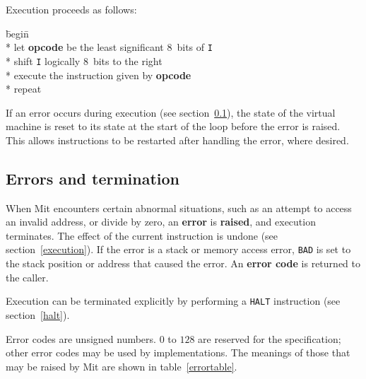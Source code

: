 \documentclass[a4paper]{article}
\newcommand{\instsize}{$8$}
\begin{document}
Execution proceeds as follows:

\begin{tabbing}
\hspace{0.5in}\=begin\=\+\+ \\*
let \textbf{opcode} be the least significant \instsize\ bits of {\tt I} \\*
shift {\tt I} logically \instsize\ bits to the right \\*
execute the instruction given by \textbf{opcode} \- \\*
repeat
\end{tabbing}

If an error occurs during execution (see section~\ref{errors}), the state of the virtual machine is reset to its state at the start of the loop before the error is raised. This allows instructions to be restarted after handling the error, where desired.

\subsection{Errors and termination}
\label{errors}

When Mit encounters certain abnormal situations, such as an attempt to access an invalid address, or divide by zero, an {\bf error} is {\bf raised}, and execution terminates. The effect of the current instruction is undone (see section~\ref{execution}). If the error is a stack or memory access error, {\tt BAD} is set to the stack position or address that caused the error. An {\bf error code} is returned to the caller.

Execution can be terminated explicitly by performing a {\tt HALT} instruction (see section~\ref{halt}).

Error codes are unsigned numbers. $0$ to $128$ are reserved for the specification; other error codes may be used by implementations. The meanings of those that may be raised by Mit are shown in table~\ref{errortable}.
\end{document}
